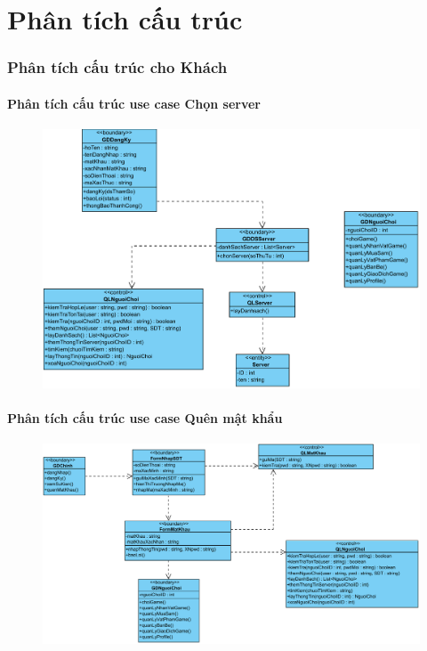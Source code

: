 \documentclass[3p]{elsarticle}
\begin{document}
\tableofcontents
\newpage
\part{Phân tích cấu trúc}
\section{Phân tích cấu trúc cho Khách}
\subsection{Phân tích cấu trúc use case Chọn server}
\begin{figure}[!htbp]
	\hspace*{-.5in}
	\centering
	\includegraphics[scale=.55]{images/structure-pdfs/guest/chonServer.pdf}
\end{figure}
\newpage

\subsection{Phân tích cấu trúc use case Quên mật khẩu}
\begin{figure}[!htbp]
	\hspace*{-.5in}
	\centering
	\includegraphics[scale=.55]{images/structure-pdfs/guest/forgetPass.pdf}
\end{figure}
\end{document}
